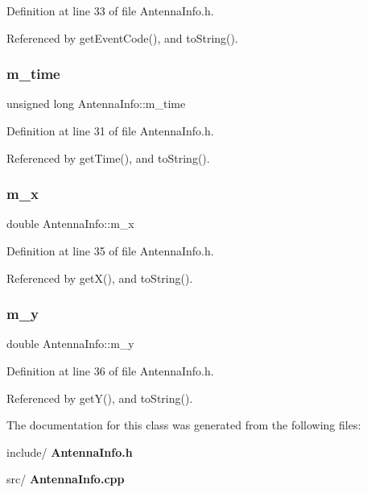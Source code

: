 Definition at line 33 of file Antenna\+Info.\+h.



Referenced by get\+Event\+Code(), and to\+String().

\mbox{\label{class_antenna_info_a355d929c83040e154f635ce149286b05}} 
\subsubsection{m\+\_\+time}
{\footnotesize\ttfamily unsigned long Antenna\+Info\+::m\+\_\+time\hspace{0.3cm}{\ttfamily [private]}}



Definition at line 31 of file Antenna\+Info.\+h.



Referenced by get\+Time(), and to\+String().

\mbox{\label{class_antenna_info_a80e006159e01abca28d465e80b327992}} 
\subsubsection{m\+\_\+x}
{\footnotesize\ttfamily double Antenna\+Info\+::m\+\_\+x\hspace{0.3cm}{\ttfamily [private]}}



Definition at line 35 of file Antenna\+Info.\+h.



Referenced by get\+X(), and to\+String().

\mbox{\label{class_antenna_info_a3a9ec27d75b8d2f0d750d64b7a2a3069}} 
\subsubsection{m\+\_\+y}
{\footnotesize\ttfamily double Antenna\+Info\+::m\+\_\+y\hspace{0.3cm}{\ttfamily [private]}}



Definition at line 36 of file Antenna\+Info.\+h.



Referenced by get\+Y(), and to\+String().



The documentation for this class was generated from the following files\+:\begin{DoxyCompactItemize}
\item 
include/\textbf{ Antenna\+Info.\+h}\item 
src/\textbf{ Antenna\+Info.\+cpp}\end{DoxyCompactItemize}
